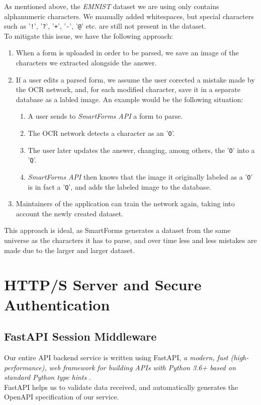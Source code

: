 \documentclass[11pt, a4paper]{report}
\def\code#1{\texttt{#1}}
\begin{document}
As mentioned above, the \textit{EMNIST} dataset we are using only contains alphanumeric characters. We manually added whitespaces, but special characters such as '\code{!}', '\code{?}', '\code{+}', '\code{-}', '\code{@}' etc. are still not present in the dataset.
\\
To mitigate this issue, we have the following approach:
\begin{enumerate}
	\item When a form is uploaded in order to be parsed, we save an image of the characters we extracted alongside the answer.
	\item If a user edits a parsed form, we assume the user corected a mistake made by the OCR network, and, for each modified character, save it in a separate database as a labled image. An example would be the following situation:
	\begin{enumerate}
		\item A user sends to \textit{SmartForms API} a form to parse.
		\item The OCR network detects a character as an '\code{O}'.
		\item The user later updates the answer, changing, among others, the '\code{O}' into a '\code{Q}'.
		\item \textit{SmartForms API} then knows that the image it originally labeled as a '\code{O}' is in fact a '\code{Q}', and adds the labeled image to the database.
	\end{enumerate}
	\item Maintainers of the application can train the network again, taking into account the newly created dataset.
\end{enumerate}

This approach is ideal, as SmartForms generates a dataset from the same universe as the characters it has to parse, and over time less and less mistakes are made due to the larger and larger dataset.

\chapter{HTTP/S Server and Secure Authentication}
\label{chapter-https-server}

\section{FastAPI Session Middleware}

Our entire API backend service is written using FastAPI, \textit{a modern, fast (high-performance), web framework for building APIs with Python 3.6+ based on standard Python type hints} \cite{FastAPI}.
\\
FastAPI helps us to validate data received, and automatically generates the OpenAPI \cite{open-api} specification of our service.
\end{document}
